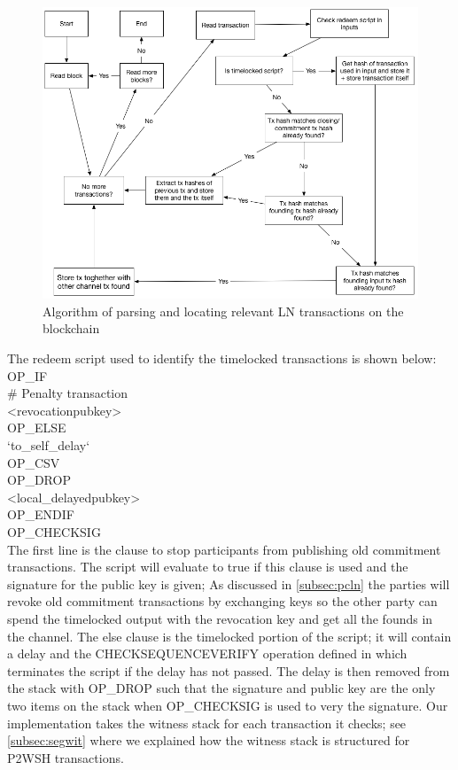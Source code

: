 \begin{figure}[h]
    \centering
    \includegraphics[width=14cm]{figures/algorithm.png}
    \caption{Algorithm of parsing and locating relevant LN transactions on the blockchain}
    \label{fig:algo}
\end{figure}


The redeem script used to identify the timelocked transactions is shown below: \cite{bolt3}
\\

\noindent OP\_IF \\
\indent   # Penalty transaction \\
\indent    <revocationpubkey> \\
OP\_ELSE\\
\indent    `to\_self\_delay`\\
\indent    OP\_CSV\\
\indent    OP\_DROP\\
\indent    <local\_delayedpubkey>\\
OP\_ENDIF\\
OP\_CHECKSIG\\

The first line is the clause to stop participants from publishing old commitment transactions. The script will evaluate to true if this clause is used and the signature for the public key is given; As discussed in \cref{subsec:pcln} the parties will revoke old commitment transactions by exchanging keys so the other party can spend the timelocked output with the revocation key and get all the founds in the channel. The else clause is the timelocked portion of the script; it will contain a delay and the CHECKSEQUENCEVERIFY operation defined in \cite{BIP112} which terminates the script if the delay has not passed. The delay is then removed from the stack with OP\_DROP such that the signature and public key are the only two items on the stack when OP\_CHECKSIG is used to very the signature.
Our implementation takes the witness stack for each transaction it checks; see \cref{subsec:segwit} where we explained how the witness stack is structured for P2WSH transactions. %
\\

